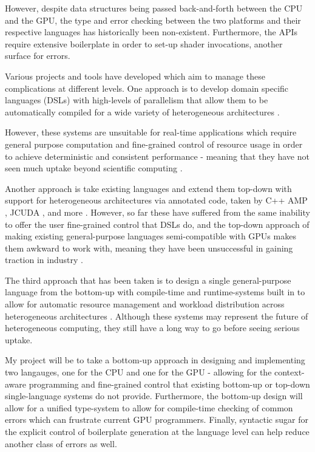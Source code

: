 \documentclass[11pt]{article}
\begin{document}
However, despite data structures being passed back-and-forth between the CPU and
the GPU, the type and error checking between the two platforms and their
respective languages has historically been non-existent. Furthermore, the APIs
require extensive boilerplate in order to set-up shader invocations, another
surface for errors.

Various projects and tools have developed which aim to manage these
complications at different levels. One approach is to develop domain specific
languages (DSLs) with high-levels of parallelism that allow them to be
automatically compiled for a wide variety of heterogeneous architectures
\cite{DSL1} \cite{DSL2} \cite{Theano2016}.

However, these systems are unsuitable for real-time applications which require
general purpose computation and fine-grained control of resource usage in order
to achieve deterministic and consistent performance - meaning that they have not
seen much uptake beyond scientific computing \cite{Theano2016}.

Another approach is take existing languages and extend them top-down with
support for heterogeneous architectures via annotated code, taken by C++ AMP
\cite{CAMP}, JCUDA \cite{JCUDA2009}, and more \cite{SYCL} \cite{HCC}
\cite{Theano2016} \cite{CParallel}. However, so far these have suffered from
the same inability to offer the user fine-grained control that DSLs do, and the
top-down approach of making existing general-purpose languages semi-compatible
with GPUs makes them awkward to work with, meaning they have been unsuccessful
in gaining traction in industry \cite{CAMPFail1} \cite{CAMPFail2}.

The third approach that has been taken is to design a single general-purpose
language from the bottom-up with compile-time and runtime-systems built in to
allow for automatic resource management and workload distribution across
heterogeneous architectures \cite{Lime2012} \cite{Lime2010}. Although these
systems may represent the future of heterogeneous computing, they still have a
long way to go before seeing serious uptake.

My project will be to take a bottom-up approach in designing and implementing
two langauges, one for the CPU and one for the GPU - allowing for the
context-aware programming and fine-grained control that existing bottom-up or
top-down single-language systems do not provide. Furthermore, the bottom-up
design will allow for a unified type-system to allow for compile-time checking
of common errors which can frustrate current GPU programmers. Finally,
syntactic sugar for the explicit control of boilerplate generation at the
language level can help reduce another class of errors as well.
\end{document}
